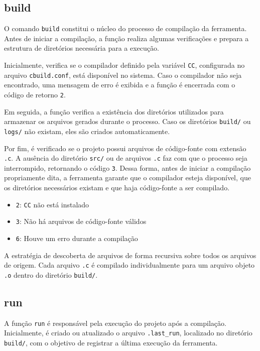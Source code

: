 \documentclass[a4paper]{article}
\begin{document}
\subsection{build}

O comando \texttt{build} constitui o núcleo do processo de compilação da
ferramenta. Antes de iniciar a compilação, a função realiza algumas
verificações e prepara a estrutura de diretórios necessária para a execução.

Inicialmente, verifica se o compilador definido pela variável \texttt{CC},
configurada no arquivo \texttt{cbuild.conf}, está disponível no sistema. Caso
o compilador não seja encontrado, uma mensagem de erro é exibida e a função
é encerrada com o código de retorno \texttt{2}.

Em seguida, a função verifica a existência dos diretórios utilizados para
armazenar os arquivos gerados durante o processo. Caso os diretórios
\texttt{build/} ou \texttt{logs/} não existam, eles são criados
automaticamente.

Por fim, é verificado se o projeto possui arquivos de código-fonte com
extensão \texttt{.c}. A ausência do diretório \texttt{src/} ou de arquivos
\texttt{.c} faz com que o processo seja interrompido, retornando o código
\texttt{3}. Dessa forma, antes de iniciar a compilação propriamente dita,
a ferramenta garante que o compilador esteja disponível, que os diretórios
necessários existam e que haja código-fonte a ser compilado.

\begin{itemize}
    \item \texttt{2}: \texttt{CC} não está instalado
    \item \texttt{3}: Não há arquivos de código-fonte válidos
    \item \texttt{6}: Houve um erro durante a compilação
\end{itemize}

A estratégia de descoberta de arquivos de forma recursiva  sobre todos os arquivos de origem. Cada arquivo \texttt{.c} é compilado individualmente para um arquivo objeto \texttt{.o} dentro do diretório \texttt{build/}.

\subsection{run}

A função \texttt{run} é responsável pela execução do projeto após a
compilação. Inicialmente, é criado ou atualizado o arquivo
\texttt{.last\_run}, localizado no diretório \texttt{build/}, com o objetivo
de registrar a última execução da ferramenta.
\end{document}
